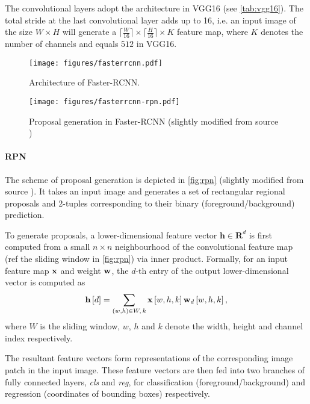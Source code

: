 The convolutional layers adopt the architecture in VGG16 (see \autoref{tab:vgg16}). The total stride at the last convolutional layer adds up to 16, i.e. an input image of the size $ W\times H $ will generate a $ \lceil \frac{W}{16}\rceil \times \lceil\frac{H}{16}\rceil \times K $ feature map, where $ K $ denotes the number of channels and equals $ 512 $ in VGG16.
\begin{figure}
	\centering
	\texttt{[image: figures/fasterrcnn.pdf]}
	\caption{Architecture of Faster-RCNN.}
	\label{fig:faster-rnn}
\end{figure}
\begin{figure}[h]
	\centering
	\texttt{[image: figures/fasterrcnn-rpn.pdf]}
	\caption[Proposal generation in Faster-RCNN]{Proposal generation in Faster-RCNN (slightly modified from source \cite{ren2015faster})}
	\label{fig:rpn}
\end{figure}
\paragraph{RPN} The scheme of proposal generation is depicted in \autoref{fig:rpn} (slightly modified from source \cite{ren2015faster}). 
It takes an input image and generates a set of rectangular regional proposals and 2-tuples corresponding to their binary (foreground/background) prediction.

To generate proposals, a lower-dimensional feature vector $ \mathbf{h}\in \mathbf{R}^d $ is first computed from a small $ n \times n $ neighbourhood of the convolutional feature map (ref the sliding window in \autoref{fig:rpn}) via inner product.
Formally, for an input feature map $ \mathbf{x} $ and weight $ \mathbf{w} $, the $ d $-th entry of the output lower-dimensional vector is computed as
\begin{equation}
\mathbf{h}\left[d\right] = \sum_{\left(w,h\right)\in W,\, k}\mathbf{x}\left[w,h,k\right]\mathbf{w}_{d}\left[w,h,k\right],\label{eq:rpnlowd}
\end{equation}
where $ W $ is the sliding window, $ w $, $ h $ and $ k $ denote the width, height and channel index respectively.

The resultant feature vectors form representations of the corresponding image patch in the input image.
These feature vectors are then fed into two branches of fully connected layers, \textit{cls} and \textit{reg}, for classification (foreground/background) and regression (coordinates of bounding boxes) respectively.

